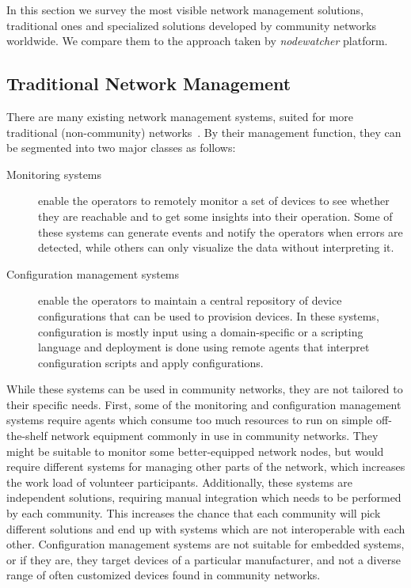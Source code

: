 \documentclass[5p,sort&compress]{elsarticle}
\newcommand{\nodewatcher}{\textit{nodewatcher}}
\begin{document}
In this section we survey the most visible network management solutions, traditional ones and specialized solutions developed by community networks worldwide.
We compare them to the approach taken by \nodewatcher{} platform.

\subsection{Traditional Network Management}

There are many existing network management systems, suited for more traditional (non-community) networks~\cite{Cacti_2004,Nagios_1999,Zabbix_2004,Puppet_2005,Salt_2011}.
By their management function, they can be segmented into two major classes as follows:
\begin{description}
\item[Monitoring systems] enable the operators to remotely monitor a set of devices to see whether they are reachable and to get some insights into their operation.
Some of these systems can generate events and notify the operators when errors are detected, while others can only visualize the data without interpreting it.

\item[Configuration management systems] enable the operators to maintain a central repository of device configurations that can be used to provision devices.
In these systems, configuration is mostly input using a domain-specific or a scripting language and deployment is done using remote agents that interpret configuration scripts and apply configurations.
\end{description}

While these systems can be used in community networks, they are not tailored to their specific needs.
First, some of the monitoring and configuration management systems require agents which consume too much resources to run on simple off-the-shelf network equipment commonly in use in community networks.
They might be suitable to monitor some better-equipped network nodes, but would require different systems for managing other parts of the network, which increases the work load of volunteer participants.
Additionally, these systems are independent solutions, requiring manual integration which needs to be performed by each community.
This increases the chance that each community will pick different solutions and end up with systems which are not interoperable with each other.
Configuration management systems are not suitable for embedded systems, or if they are, they target devices of a particular manufacturer, and not a diverse range of often customized devices found in community networks.
\end{document}
